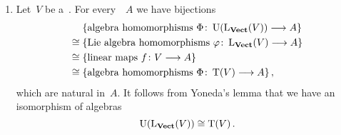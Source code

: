 \begin{example}
	\label{uea of free lie algebra}
	\leavevmode
	\begin{enumerate}
		\item
			Let~$V$ be a~\vectorspace{$\kf$}.
			For every~\algebra{$\kf$}~$A$ we have bijections
			\begin{align*}
				{}&
				\{
					\text{algebra homomorphisms~$\Phi \colon \Univ(\freelievect(V)) \to A$}
				\}
				\\
				\cong{}&
				\{
					\text{Lie~algebra homomorphisms~$\varphi \colon \freelievect(V) \to A$}
				\}
				\\
				\cong{}&
				\{
					\text{linear maps~$f \colon V \to A$}
				\}
				\\
				\cong{}&
				\{
					\text{algebra homomorphisms~$\Phi \colon \Tensor(V) \to A$}
				\} \,,
			\end{align*}
			which are natural in~$A$.
			It follows from Yoneda’s lemma that we have an isomorphism of algebras
			\[
				\Univ(\freelievect(V)) \cong \Tensor(V) \,.
				\index{universal enveloping algebra!of the free Lie algebra!on a vector space}
			\]


\end{enumerate}
\end{example}
